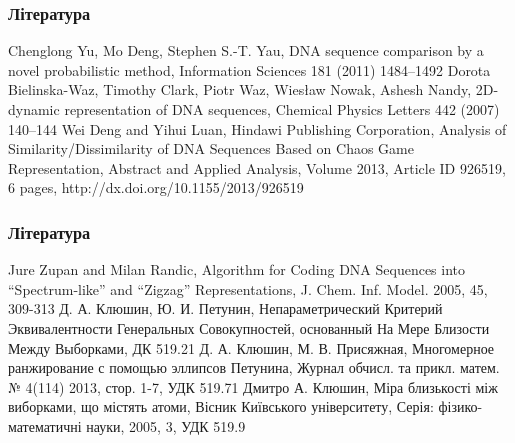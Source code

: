 \documentclass[mathserif,serif,10pt]{beamer}
\begin{document}
\begin{thebibliography}{9}

\begin{frame}
\frametitle{Література}

Chenglong Yu, Mo Deng, Stephen S.-T. Yau,
DNA sequence comparison by a novel probabilistic method,
Information Sciences 181 (2011) 1484–1492
Dorota Bielinska-Waz, Timothy Clark, Piotr Waz, Wiesław Nowak, Ashesh Nandy,
2D-dynamic representation of DNA sequences,
Chemical Physics Letters 442 (2007) 140–144
Wei Deng and Yihui Luan,
Hindawi Publishing Corporation,
Analysis of Similarity/Dissimilarity of DNA Sequences Based on Chaos Game Representation,
Abstract and Applied Analysis,
Volume 2013, Article ID 926519, 6 pages,
http://dx.doi.org/10.1155/2013/926519
\end{frame}
\begin{frame}
\frametitle{Література}
Jure Zupan and Milan Randic,
Algorithm for Coding DNA Sequences into “Spectrum-like” and “Zigzag” Representations,
J. Chem. Inf. Model. 2005, 45, 309-313
Д. А. Клюшин, Ю. И. Петунин,
Непараметрический Критерий Эквивалентности Генеральных Совокупностей, основанный На Мере Близости Между Выборками,
ДК 519.21
Д. А. Клюшин, М. В. Присяжная,
Многомерное ранжирование с помощью эллипсов Петунина,
Журнал обчисл. та прикл. матем. № 4(114) 2013, стор. 1-7,
УДК 519.71
Дмитро А. Клюшин,
Міра близькості між виборками, що містять атоми,
Вісник Київського університету,
Серія: фізико-математичні науки,
2005, 3,
УДК 519.9

\end{frame}
\end{thebibliography}
\end{document}
